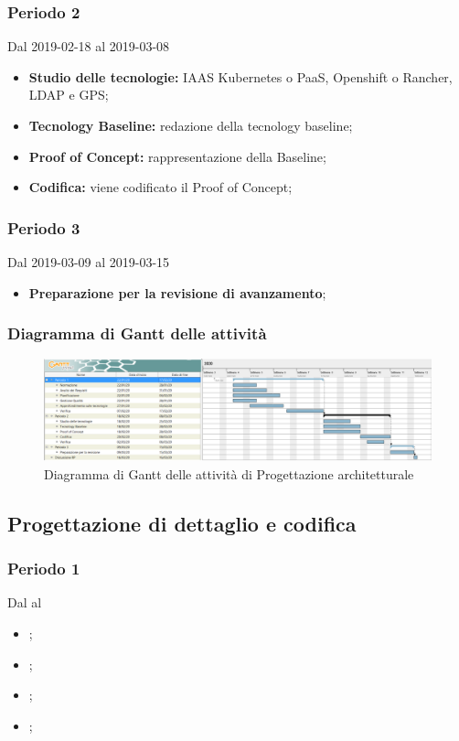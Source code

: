 \subsubsection{Periodo 2} 
Dal 2019-02-18 al 2019-03-08
\begin{itemize}
	\item \textbf{Studio delle tecnologie:} IAAS Kubernetes o PaaS, Openshift o Rancher, LDAP e GPS;
	\item \textbf{Tecnology Baseline:} redazione della tecnology baseline;
	\item \textbf{Proof of Concept:} rappresentazione della Baseline;
	\item \textbf{Codifica:} viene codificato il Proof of Concept;
\end{itemize}
\subsubsection{Periodo 3} 
Dal 2019-03-09 al 2019-03-15
\begin{itemize}
	\item \textbf{Preparazione per la revisione di avanzamento};
\end{itemize}
\subsubsection{Diagramma di Gantt delle attività}
\begin{figure}[h]
	\includegraphics[scale=0.45]{sezioni/DiagrammiGantt/RP.png}
	\caption{Diagramma di Gantt delle attività di Progettazione architetturale}
\end{figure}

\subsection{Progettazione di dettaglio e codifica}

\subsubsection{Periodo 1} 
Dal al
\begin{itemize}
	\item \textbf{};
	\item \textbf{};
	\item \textbf{};
	\item \textbf{};
\end{itemize}
